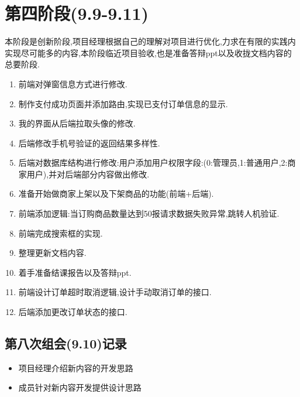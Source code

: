 \section{第四阶段(9.9-9.11)}
本阶段是创新阶段,项目经理根据自己的理解对项目进行优化,力求在有限的实践内实现尽可能多的内容,本阶段临近项目验收,也是准备答辩ppt以及收拢文档内容的总要阶段.
 \begin{enumerate}
     \item 前端对弹窗信息方式进行修改.
     \item 制作支付成功页面并添加路由,实现已支付订单信息的显示.
     \item 我的界面从后端拉取头像的修改.
     \item 后端修改手机号验证的返回结果多样性.
     \item 后端对数据库结构进行修改:用户添加用户权限字段:(0:管理员,1:普通用户,2:商家用户),并对后端部分内容做出修改.
     \item 准备开始做商家上架以及下架商品的功能(前端+后端).
     \item 前端添加逻辑:当订购商品数量达到50报请求数据失败异常,跳转人机验证.
     \item 前端完成搜索框的实现.
     \item 整理更新文档内容.
     \item 着手准备结课报告以及答辩ppt.
     \item 前端设计订单超时取消逻辑,设计手动取消订单的接口.
     \item 后端添加更改订单状态的接口.
 \end{enumerate}

 \subsection{第八次组会(9.10)记录}
\begin{itemize}
    \item 项目经理介绍新内容的开发思路
    \item 成员针对新内容开发提供设计思路
\end{itemize}